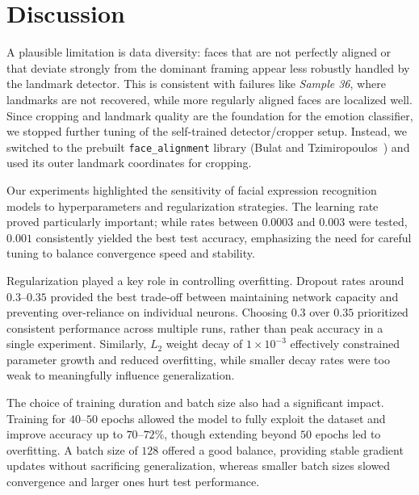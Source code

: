 \section{Discussion}
\label{sec:discussion}

A plausible limitation is data diversity: faces that are not perfectly aligned or that deviate strongly from the dominant framing appear less robustly handled by the landmark detector.
This is consistent with failures like \textit{Sample 36}, where landmarks are not recovered, while more regularly aligned faces are localized well.
Since cropping and landmark quality are the foundation for the emotion classifier, we stopped further tuning of the self-trained detector/cropper setup.
Instead, we switched to the prebuilt \texttt{face\_alignment} library (Bulat and Tzimiropoulos~\cite{bulat2017far}) and used its outer landmark coordinates for cropping.
\vspace{0.35em}

Our experiments highlighted the sensitivity of facial expression recognition models to hyperparameters and regularization strategies. The learning rate proved particularly important; while rates between \( 0.0003 \) and \( 0.003 \) were tested, \( 0.001 \) consistently yielded the best test accuracy, emphasizing the need for careful tuning to balance convergence speed and stability.
\vspace{0.35em}

Regularization played a key role in controlling overfitting. Dropout rates around \( 0.3 \text{--} 0.35 \) provided the best trade-off between maintaining network capacity and preventing over-reliance on individual neurons. Choosing \( 0.3 \) over \( 0.35 \) prioritized consistent performance across multiple runs, rather than peak accuracy in a single experiment. Similarly, \( L_2 \) weight decay of \( 1 \times 10^{-3} \) effectively constrained parameter growth and reduced overfitting, while smaller decay rates were too weak to meaningfully influence generalization.
\vspace{0.35em}

The choice of training duration and batch size also had a significant impact. Training for \( 40 \text{--} 50 \) epochs allowed the model to fully exploit the dataset and improve accuracy up to \( 70 \text{--} 72\% \), though extending beyond \( 50 \) epochs led to overfitting. A batch size of \( 128 \) offered a good balance, providing stable gradient updates without sacrificing generalization, whereas smaller batch sizes slowed convergence and larger ones hurt test performance.
\vspace{0.35em}

